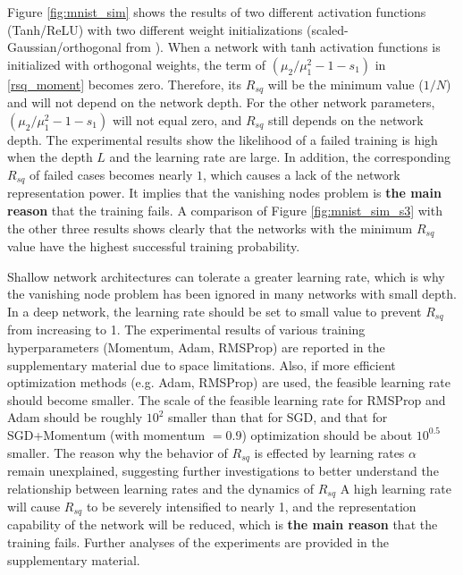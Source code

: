 Figure \ref{fig:mnist_sim} shows the results of two different activation functions (Tanh/ReLU) with two different weight initializations (scaled-Gaussian/orthogonal from \cite{mft:linear}). When a network with tanh activation functions is initialized with orthogonal weights, the term of  $(\mu_2/\mu_1^2-1-s_1)$ in \eqref{rsq_moment} becomes zero. Therefore, its $R_{sq}$ will be the minimum value ($1/N$) and will not depend on the network depth. For the other network parameters, $(\mu_2/\mu_1^2-1-s_1) $ will not equal zero, and $R_{sq}$ still depends on the network depth. The experimental results show the likelihood of a failed training is high when the depth $L$ and the learning rate are large. In addition, the corresponding $R_{sq}$ of failed cases becomes nearly $1$, which causes a lack of the network representation power.
It implies that the vanishing nodes problem is \textbf{the main reason} that the training fails. A comparison of Figure \ref{fig:mnist_sim_s3} with the other three results shows clearly that the networks with the minimum $R_{sq}$ value have the highest successful training probability.

Shallow network architectures can tolerate a greater learning rate, which is why the vanishing node problem has been ignored in many networks with small depth. In a deep network, the learning rate should be set to small value to prevent $R_{sq}$ from increasing to 1. The experimental results of various training hyperparameters (Momentum, %
Adam, RMSProp) are reported in the supplementary material due to space limitations. Also, if more efficient optimization methods (e.g. Adam, RMSProp) are used, the feasible learning rate should become smaller. The scale of the feasible learning rate for RMSProp and Adam should be roughly $10^2$ smaller than that for SGD, and that for SGD+Momentum (with momentum $=0.9$) optimization should be about $10^{0.5}$ smaller.
The reason why the behavior of $R_{sq}$ is effected by learning rates $\alpha$ remain unexplained, suggesting further investigations to better understand the relationship between learning rates and the dynamics of $R_{sq}$
A high learning rate will cause $R_{sq}$ to be severely intensified to nearly 1, and the representation capability of the network will be reduced, which is \textbf{the main reason} that the training fails.
Further analyses of the experiments are provided in the supplementary material.
